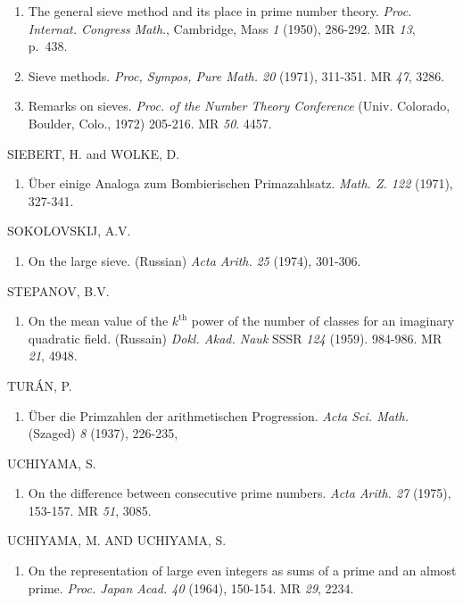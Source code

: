 \begin{thebibliography}{99}
\begin{enumerate}
\item The general sieve method and its place in  prime number
  theory. \textit{Proc. Internat. Congress Math}., Cambridge, Mass
  {\em 1} (1950), 286-292. MR  {\em 13}, p.~438. 

\item Sieve methods. \textit{Proc, Sympos, Pure Math. 20} (1971),
  311-351. MR {\em 47}, 3286.  

\item Remarks on sieves. \textit{Proc. of the Number Theory
  Conference} (Univ. Colorado, Boulder, Colo., 1972) 205-216. MR
  {\em 50}. 4457.  
\end{enumerate}

 SIEBERT, H. and WOLKE, D. 
\begin{enumerate}
\item \"{U}ber einige Analoga zum Bombierischen
  Primazahlsatz. \textit{Math. Z. 122} (1971), 327-341.
\end{enumerate}

 SOKOLOVSKIJ, A.V.\pageoriginale
\begin{enumerate}
\item On the large sieve. (Russian) \textit{Acta Arith.} {\em 25}
  (1974), 301-306. 
\end{enumerate}

 STEPANOV, B.V. 
\begin{enumerate}
\item On the mean value of the $k^{\text{th}}$ power of the number of classes
  for an imaginary quadratic field. (Russain) \textit{Dokl. Akad.
    Nauk} SSSR {\em 124} (1959). 984-986. MR {\em 21}, 4948.  
\end{enumerate}

 TUR\'AN, P.
\begin{enumerate}
\item \"{U}ber die Primzahlen der arithmetischen
  Progression. \textit{Acta Sci. Math.} (Szaged) {\em 8} (1937), 226-235,
\end{enumerate}

 UCHIYAMA, S. 
\begin{enumerate} 
\item On the difference between consecutive prime
  numbers. \textit{Acta Arith. 27} (1975), 153-157. MR {\em 51}, 3085.
\end{enumerate}

 UCHIYAMA, M. AND UCHIYAMA, S.
\begin{enumerate}
\item On the representation of large even integers as sums of a prime
  and an almost prime. \textit{Proc. Japan Acad. 40} (1964),
  150-154. MR {\em 29}, 2234. 
\end{enumerate}


\end{thebibliography}

